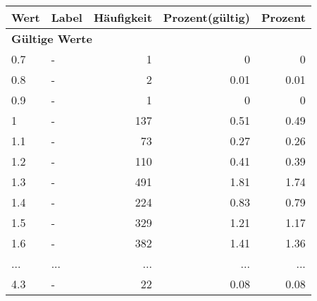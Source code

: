      \begin{longtable}{lXrrr}
     \toprule
     \textbf{Wert} & \textbf{Label} & \textbf{Häufigkeit} & \textbf{Prozent(gültig)} & \textbf{Prozent} \\
     \endhead
     \midrule
     \multicolumn{5}{l}{\textbf{Gültige Werte}}\\
        0.7 & \multicolumn{1}{X}{-} & %
          \num{1} &
          \num[round-mode=places,round-precision=2]{0} &
          \num[round-mode=places,round-precision=2]{0} \\
        0.8 & \multicolumn{1}{X}{-} & %
          \num{2} &
          \num[round-mode=places,round-precision=2]{0.01} &
          \num[round-mode=places,round-precision=2]{0.01} \\
        0.9 & \multicolumn{1}{X}{-} & %
          \num{1} &
          \num[round-mode=places,round-precision=2]{0} &
          \num[round-mode=places,round-precision=2]{0} \\
        1 & \multicolumn{1}{X}{-} & %
          \num{137} &
          \num[round-mode=places,round-precision=2]{0.51} &
          \num[round-mode=places,round-precision=2]{0.49} \\
        1.1 & \multicolumn{1}{X}{-} & %
          \num{73} &
          \num[round-mode=places,round-precision=2]{0.27} &
          \num[round-mode=places,round-precision=2]{0.26} \\
        1.2 & \multicolumn{1}{X}{-} & %
          \num{110} &
          \num[round-mode=places,round-precision=2]{0.41} &
          \num[round-mode=places,round-precision=2]{0.39} \\
        1.3 & \multicolumn{1}{X}{-} & %
          \num{491} &
          \num[round-mode=places,round-precision=2]{1.81} &
          \num[round-mode=places,round-precision=2]{1.74} \\
        1.4 & \multicolumn{1}{X}{-} & %
          \num{224} &
          \num[round-mode=places,round-precision=2]{0.83} &
          \num[round-mode=places,round-precision=2]{0.79} \\
        1.5 & \multicolumn{1}{X}{-} & %
          \num{329} &
          \num[round-mode=places,round-precision=2]{1.21} &
          \num[round-mode=places,round-precision=2]{1.17} \\
        1.6 & \multicolumn{1}{X}{-} & %
          \num{382} &
          \num[round-mode=places,round-precision=2]{1.41} &
          \num[round-mode=places,round-precision=2]{1.36} \\
       ... & ... & ... & ... & ... \\
        4.3 & \multicolumn{1}{X}{-} & %
          \num{22} &
          \num[round-mode=places,round-precision=2]{0.08} &
          \num[round-mode=places,round-precision=2]{0.08} \\


\end{longtable}
